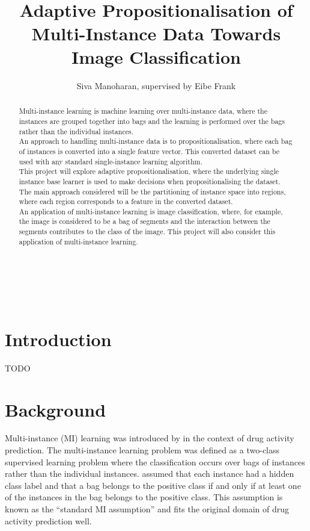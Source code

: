 \documentclass[a4paper,12pt]{article} %
\title{\ \\ \  \\ Adaptive Propositionalisation of Multi-Instance Data Towards Image Classification}
\author{Siva Manoharan, supervised by Eibe Frank}
\begin{document}

\maketitle 
\ \\ \ \ %
\begin{abstract}
Multi-instance learning is machine learning over multi-instance data, where the instances are grouped together into bags and the learning is performed over the bags rather than the individual instances. \\

An approach to handling multi-instance data is to propositionalisation, where each bag of instances is converted into a single feature vector. This converted dataset can be used with any standard single-instance learning algorithm. \\

This project will explore adaptive propositionalisation, where the underlying single instance base learner is used to make decisions when propositionalising the dataset. The main approach considered will be the partitioning of instance space into regions, where each region corresponds to a feature in the converted dataset. \\
    
An application of multi-instance learning is image classification, where, for example, the image is considered to be a bag of segments and the interaction between the segments contributes to the class of the image. This project will also consider this application of multi-instance learning.
\end{abstract}

\thispagestyle{empty}

\clearpage
{}  

\section{Introduction} 

TODO

\section{Background}

Multi-instance (MI) learning was introduced by  in the context of drug activity prediction. The multi-instance learning problem was defined as a two-class supervised learning problem where the classification occurs over bags of instances rather than the individual instances.  assumed that each instance had a hidden class label and that a bag belongs to the positive class if and only if at least one of the instances in the bag belongs to the positive class. This assumption is known as the ``standard MI assumption'' and fits the original domain of drug activity prediction well.
\end{document}
